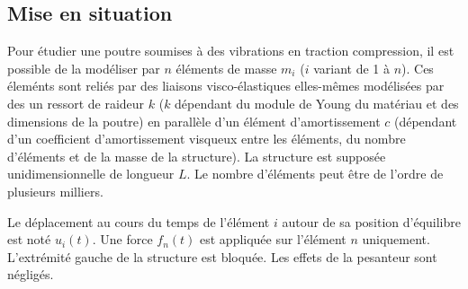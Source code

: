 \documentclass[10pt,fleqn]{article} %
\begin{document}

\vspace{10cm}
\pagestyle{fancy}
\thispagestyle{plain}


\def\columnseprulecolor{\color{ocre}}
\setlength{\columnseprule}{0.4pt} 
\begin{multicols}{2}

\section*{Mise en situation}

Pour étudier une poutre soumises à des vibrations en traction compression, il est possible de la modéliser par $n$ éléments de masse $m_i$ ($i$ variant de 1 à $n$). Ces éleménts sont reliés par des liaisons visco-élastiques elles-mêmes modélisées par des un ressort de raideur $k$ ($k$ dépendant du module de Young du matériau et des dimensions de la poutre) en parallèle d'un élément d'amortissement $c$ (dépendant d'un coefficient d'amortissement visqueux entre les éléments, du nombre d'éléments et de la masse de la structure). La structure est supposée unidimensionnelle de longueur $L$. Le nombre d'éléments peut être de l'ordre de plusieurs milliers. 

Le déplacement au cours du temps de l'élément $i$ autour de sa position d'équilibre est noté $u_i(t)$. Une force $f_n(t)$ est appliquée sur l'élément $n$ uniquement. L'extrémité gauche de
la structure est bloquée. Les effets de la pesanteur sont négligés.

\begin{obj}

\end{obj}



\end{multicols}
\end{document}

